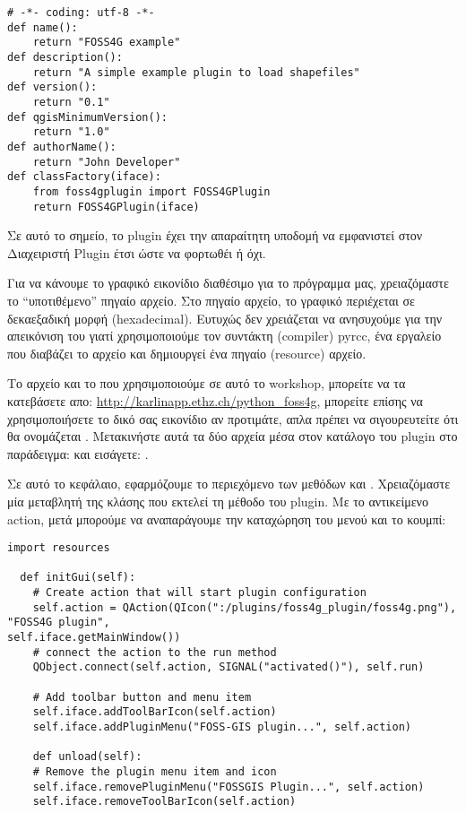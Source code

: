 \begin{verbatim}
# -*- coding: utf-8 -*-
def name():
    return "FOSS4G example"
def description():
    return "A simple example plugin to load shapefiles"
def version():
    return "0.1"
def qgisMinimumVersion():
    return "1.0"
def authorName():
    return "John Developer"
def classFactory(iface):
    from foss4gplugin import FOSS4GPlugin
    return FOSS4GPlugin(iface)
\end{verbatim}

Σε αυτό το σημείο, το plugin έχει την απαραίτητη υποδομή να εμφανιστεί στον Διαχειριστή Plugin  έτσι ώστε να φορτωθέι ή όχι. 


Για να κάνουμε το γραφικό εικονίδιο διαθέσιμο για το πρόγραμμα μας, χρειαζόμαστε το “υποτιθέμενο” πηγαίο αρχείο. Στο πηγαίο αρχείο, το γραφικό περιέχεται σε δεκαεξαδική μορφή (hexadecimal). Ευτυχώς δεν χρειάζεται να ανησυχούμε για την απεικόνιση του γιατί χρησιμοποιούμε τον συντάκτη (compiler) pyrcc, ένα εργαλείο που διαβάζει το αρχείο  και δημιουργεί ένα πηγαίο (resource) αρχείο.

Το αρχείο  και το  που χρησιμοποιούμε σε αυτό το workshop, μπορείτε να τα κατεβάσετε απο: \url{http://karlinapp.ethz.ch/python\_foss4g}, μπορείτε επίσης να χρησιμοποιήσετε το δικό σας εικονίδιο αν προτιμάτε, απλα πρέπει να σιγουρευτείτε ότι θα ονομάζεται
. Μετακινήστε αυτά τα δύο αρχεία μέσα στον κατάλογο του plugin στο παράδειγμα: 
 και εισάγετε: .


Σε αυτό το κεφάλαιο, εφαρμόζουμε το περιεχόμενο των μεθόδων  και
. Χρειαζόμαστε μία μεταβλητή της κλάσης που εκτελεί τη μέθοδο
 του plugin. Με το αντικείμενο action, μετά μπορούμε να αναπαράγουμε την καταχώρηση του μενού και το κουμπί: 

\begin{verbatim}
import resources

  def initGui(self):
    # Create action that will start plugin configuration
    self.action = QAction(QIcon(":/plugins/foss4g_plugin/foss4g.png"), "FOSS4G plugin",
self.iface.getMainWindow())
    # connect the action to the run method
    QObject.connect(self.action, SIGNAL("activated()"), self.run)

    # Add toolbar button and menu item
    self.iface.addToolBarIcon(self.action)
    self.iface.addPluginMenu("FOSS-GIS plugin...", self.action)

    def unload(self):
    # Remove the plugin menu item and icon
    self.iface.removePluginMenu("FOSSGIS Plugin...", self.action)
    self.iface.removeToolBarIcon(self.action)
\end{verbatim}


